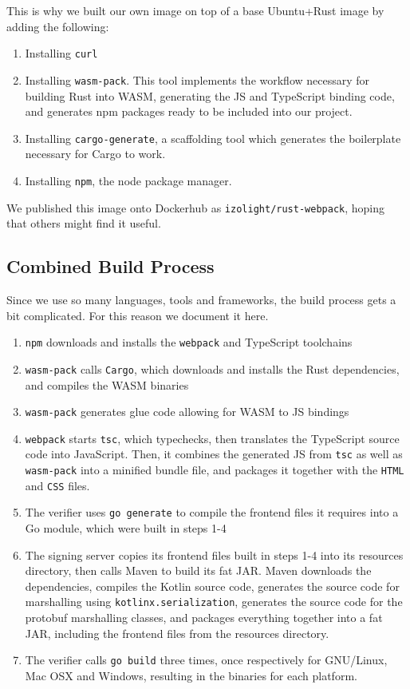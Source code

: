 This is why we built our own image on top of a base Ubuntu+Rust image by adding the following:
\begin{enumerate}
    \item Installing \texttt{curl}
    \item Installing \texttt{wasm-pack}.
    This tool implements the workflow necessary for building Rust into \gls{WASM},
    generating the \gls{JS} and TypeScript binding code,
    and generates npm packages ready to be included into our project.
    \item Installing \texttt{cargo-generate}, a scaffolding tool which generates the boilerplate necessary for Cargo to work.
    \item Installing \texttt{npm}, the node package manager.
\end{enumerate}

We published this image onto Dockerhub as \texttt{izolight/rust-webpack},
hoping that others might find it useful.

\subsection{Combined Build Process}\label{subsec:combined-build-process}
Since we use so many languages, tools and frameworks,
the build process gets a bit complicated.
For this reason we document it here.

\begin{enumerate}
    \item \texttt{npm} downloads and installs the \texttt{webpack} and TypeScript toolchains
    \item \texttt{wasm-pack} calls \texttt{Cargo},
    which downloads and installs the Rust dependencies,
    and compiles the \gls{WASM} binaries
    \item \texttt{wasm-pack} generates glue code allowing for \gls{WASM} to \gls{JS} bindings
    \item \texttt{webpack} starts \texttt{tsc}, which typechecks,
    then translates the TypeScript source code into JavaScript.
    Then, it combines the generated \gls{JS} from \texttt{tsc} as well as \texttt{wasm-pack} into a minified bundle file,
    and packages it together with the \texttt{HTML} and \texttt{CSS} files.
    \item The verifier uses \texttt{go generate} to compile the frontend files it requires into a Go module,
    which were built in steps 1-4
    \item The signing server copies its frontend files built in steps 1-4 into its resources directory,
    then calls Maven to build its fat \gls{JAR}.
    Maven downloads the dependencies,
    compiles the Kotlin source code,
    generates the source code for marshalling using \texttt{kotlinx.serialization},
    generates the source code for the protobuf marshalling classes,
    and packages everything together into a fat \gls{JAR},
    including the frontend files from the resources directory.
    \item The verifier calls \texttt{go build} three times,
    once respectively for GNU/Linux, Mac OSX and Windows,
    resulting in the binaries for each platform.
\end{enumerate}


